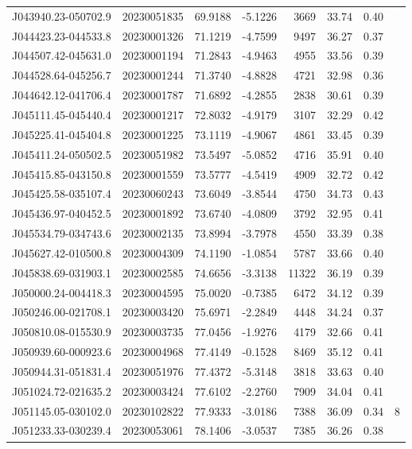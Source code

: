 \documentclass{article}
\begin{document}
\begin {longtable}{|l|l|r|r|r|r|r|l|}
 J043940.23-050702.9&  20230051835&   69.9188&   -5.1226&  3669& 33.74& 0.40&\\
 J044423.23-044533.8&  20230001326&   71.1219&   -4.7599&  9497& 36.27& 0.37&\\
 J044507.42-045631.0&  20230001194&   71.2843&   -4.9463&  4955& 33.56& 0.39&\\
 J044528.64-045256.7&  20230001244&   71.3740&   -4.8828&  4721& 32.98& 0.36&\\
 J044642.12-041706.4&  20230001787&   71.6892&   -4.2855&  2838& 30.61& 0.39&\\
 J045111.45-045440.4&  20230001217&   72.8032&   -4.9179&  3107& 32.29& 0.42&\\
 J045225.41-045404.8&  20230001225&   73.1119&   -4.9067&  4861& 33.45& 0.39&\\
 J045411.24-050502.5&  20230051982&   73.5497&   -5.0852&  4716& 35.91& 0.40&\\
 J045415.85-043150.8&  20230001559&   73.5777&   -4.5419&  4909& 32.72& 0.42&\\
 J045425.58-035107.4&  20230060243&   73.6049&   -3.8544&  4750& 34.73& 0.43&\\
 J045436.97-040452.5&  20230001892&   73.6740&   -4.0809&  3792& 32.95& 0.41&\\
 J045534.79-034743.6&  20230002135&   73.8994&   -3.7978&  4550& 33.39& 0.38&\\
 J045627.42-010500.8&  20230004309&   74.1190&   -1.0854&  5787& 33.66& 0.40&\\
 J045838.69-031903.1&  20230002585&   74.6656&   -3.3138& 11322& 36.19& 0.39&\\
 J050000.24-004418.3&  20230004595&   75.0020&   -0.7385&  6472& 34.12& 0.39&\\
 J050246.00-021708.1&  20230003420&   75.6971&   -2.2849&  4448& 34.24& 0.37&\\
 J050810.08-015530.9&  20230003735&   77.0456&   -1.9276&  4179& 32.66& 0.41&\\
 J050939.60-000923.6&  20230004968&   77.4149&   -0.1528&  8469& 35.12& 0.41&\\
 J050944.31-051831.4&  20230051976&   77.4372&   -5.3148&  3818& 33.63& 0.40&\\
 J051024.72-021635.2&  20230003424&   77.6102&   -2.2760&  7909& 34.04& 0.41&\\
 J051145.05-030102.0&  20230102822&   77.9333&   -3.0186&  7388& 36.09& 0.34&8\\%
 J051233.33-030239.4&  20230053061&   78.1406&   -3.0537&  7385& 36.26& 0.38&\\

\end{longtable}
\end{document}
